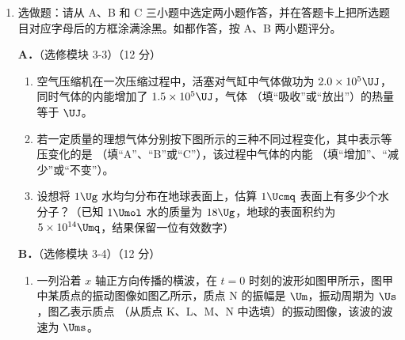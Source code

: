 \documentclass[\gkver]{gaokaozhenti}
\begin{document}
\begin{enumerate}

\item
选做题：请从 A、B 和 C 三小题中选定两小题作答，并在答题卡上把所选题目对应字母后的方框涂满涂黑。如都作答，按 A、B 两小题评分。

\textbf{A．}（选修模块 3-3）（12 分）

\begin{enumerate}
	\item
	空气压缩机在一次压缩过程中，活塞对气缸中气体做功为 $2.0\times10^{5}\UJ$，同时气体的内能增加了 $1.5\times10^{5}\UJ$，气体 \tkanswer[1.5cm]{}（填“吸收”或“放出”）的热量等于 \tkanswer[2cm]{} $\UJ$。
	
	\item
	若一定质量的理想气体分别按下图所示的三种不同过程变化，其中表示等压变化的是 \tkanswer[1.5cm]{}（填“A”、“B”或“C”），该过程中气体的内能 \tkanswer[1.5cm]{}（填“增加”、“减少”或“不变”）。
	
	\item
	设想将 $1\Ug$ 水均匀分布在地球表面上，估算 $1\Ucmq$ 表面上有多少个水分子？（已知 $1\Umol$ 水的质量为 $18\Ug$，地球的表面积约为 $5\times10^{14}\Umq$，结果保留一位有效数字）
\end{enumerate}


\textbf{B．}（选修模块 3-4）（12 分）

\begin{enumerate}
	\item
	一列沿着 $x$ 轴正方向传播的横波，在 $t=0$ 时刻的波形如图甲所示，图甲中某质点的振动图像如图乙所示，质点 N 的振幅是 \tkanswer[1.5cm]{} $\Um$，振动周期为 \tkanswer[1.2cm]{} $\Us$，图乙表示质点 \tkanswer[1.2cm]{}（从质点 K、L、M、N 中选填）的振动图像，该波的波速为 \tkanswer[1.5cm]{} $\Ums$。
	

\end{enumerate}
\end{enumerate}
\end{document}
